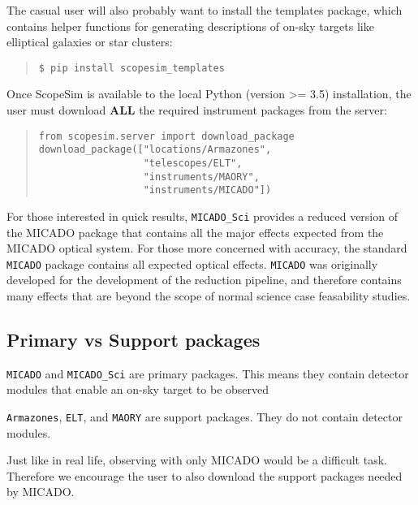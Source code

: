 The casual user will also probably want to install the templates package, which contains helper functions for generating descriptions of on-sky targets like elliptical galaxies or star clusters:

\begin{quote}
\begin{alltt}
\begin{lstlisting}[frame=single]
$ pip install scopesim_templates
\end{lstlisting}
\end{alltt}
\end{quote}

Once ScopeSim is available to the local Python (version >= 3.5) installation, the user must download \textbf{ALL} the required instrument packages from the server:

\begin{quote}
\begin{alltt}
\begin{lstlisting}[frame=single]
from scopesim.server import download_package
download_package(["locations/Armazones",
                  "telescopes/ELT",
                  "instruments/MAORY",
                  "instruments/MICADO"])
\end{lstlisting}
\end{alltt}
\end{quote}


For those interested in quick results, \texttt{MICADO\_Sci} provides a reduced version of the MICADO package that contains all the major effects expected from the MICADO optical system.
For those more concerned with accuracy, the standard \texttt{MICADO} package contains all expected optical effects.
\texttt{MICADO} was originally developed for the development of the reduction pipeline, and therefore contains many effects that are beyond the scope of normal science case feasability studies.


\subsection{Primary vs Support packages%
  \label{primary-vs-support-packages}%
}

\texttt{MICADO} and \texttt{MICADO\_Sci} are primary packages.
This means they contain detector modules that enable an on-sky target to be observed

\texttt{Armazones}, \texttt{ELT}, and \texttt{MAORY} are support packages.
They do not contain detector modules.

Just like in real life, observing with only MICADO would be a difficult task.
Therefore we encourage the user to also download the support packages needed by MICADO.
